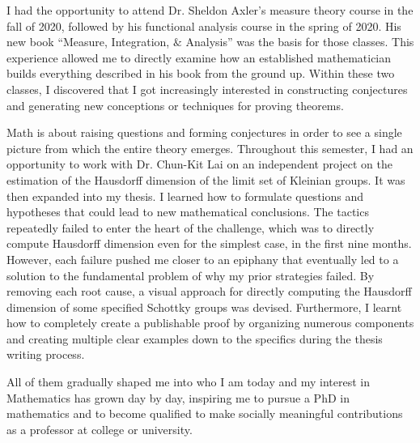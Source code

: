 \documentclass[10pt]{amsart}
\begin{document}
I had the opportunity to attend Dr. Sheldon Axler's measure theory course in the fall of 2020,
followed by his functional analysis course in the spring of 2020. His new book ``Measure, Integration, $\&$ Analysis'' was the basis for those classes. This experience allowed me to directly examine how an established mathematician builds everything described in his book from the ground up. Within these two classes, I discovered that I got increasingly interested in constructing conjectures and generating new conceptions or techniques for proving theorems.

Math is about raising questions and forming conjectures in order to see a single picture from which the entire theory emerges. Throughout this semester, I had an opportunity to work with Dr. Chun-Kit Lai on an independent project on the estimation of the Hausdorff dimension of the limit set of Kleinian groups. It was then expanded into my thesis. I learned how to formulate questions and hypotheses that could lead to new mathematical conclusions. The tactics repeatedly failed to enter the heart of the challenge, which was to directly compute Hausdorff dimension even for the simplest case, in the first nine months. However, each failure pushed me closer to an epiphany that eventually led to a solution to the fundamental problem of why my prior strategies failed. By removing each root cause, a visual approach for directly computing the Hausdorff dimension of some specified Schottky groups was devised. Furthermore, I learnt how to completely create a publishable proof by organizing numerous components and creating multiple clear examples down to the specifics during the thesis writing process.


All of them gradually shaped me into who I am today and my interest in Mathematics has grown day by day, inspiring me to pursue a PhD in mathematics and to become qualified to make socially meaningful contributions as a professor at college or university.
\end{document}
